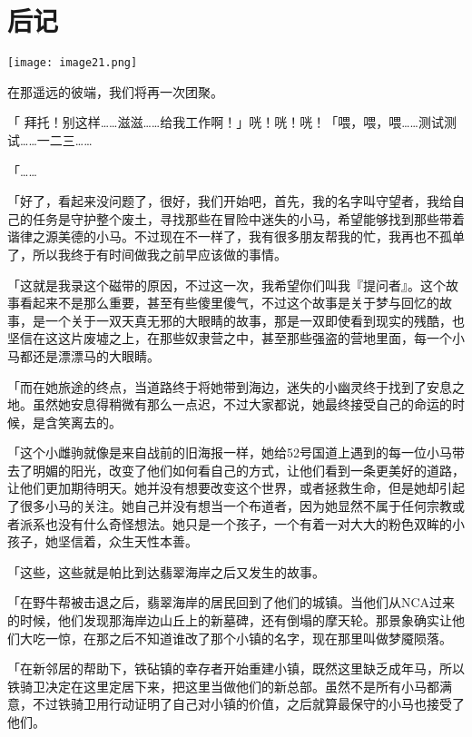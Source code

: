 \chapter{后记}

\pagestyle{chinese} %

\texttt{[image: image21.png]}

\begin{intro}
    在那遥远的彼端，我们将再一次团聚。
\end{intro}

{\rt

「 拜托！别这样……滋滋……给我工作啊！」咣！咣！咣！「喂，喂，喂……测试测试……一二三……

「……

「好了，看起来没问题了，很好，我们开始吧，首先，我的名字叫守望者，我给自己的任务是守护整个废土，寻找那些在冒险中迷失的小马，希望能够找到那些带着谐律之源美德的小马。不过现在不一样了，我有很多朋友帮我的忙，我再也不孤单了，所以我终于有时间做我之前早应该做的事情。

「这就是我录这个磁带的原因，不过这一次，我希望你们叫我『提问者』。这个故事看起来不是那么重要，甚至有些傻里傻气，不过这个故事是关于梦与回忆的故事，是一个关于一双天真无邪的大眼睛的故事，那是一双即使看到现实的残酷，也坚信在这这片废墟之上，在那些奴隶营之中，甚至那些强盗的营地里面，每一个小马都还是漂漂马的大眼睛。

「而在她旅途的终点，当道路终于将她带到海边，迷失的小幽灵终于找到了安息之地。虽然她安息得稍微有那么一点迟，不过大家都说，她最终接受自己的命运的时候，是含笑离去的。

「这个小雌驹就像是来自战前的旧海报一样，她给52号国道上遇到的每一位小马带去了明媚的阳光，改变了他们如何看自己的方式，让他们看到一条更美好的道路，让他们更加期待明天。她并没有想要改变这个世界，或者拯救生命，但是她却引起了很多小马的关注。她自己并没有想当一个布道者，因为她显然不属于任何宗教或者派系也没有什么奇怪想法。她只是一个孩子，一个有着一对大大的粉色双眸的小孩子，她坚信着，众生天性本善。

「这些，这些就是帕比到达翡翠海岸之后又发生的故事。

「在野牛帮被击退之后，翡翠海岸的居民回到了他们的城镇。当他们从NCA过来的时候，他们发现那海岸边山丘上的新墓碑，还有倒塌的摩天轮。那景象确实让他们大吃一惊，在那之后不知道谁改了那个小镇的名字，现在那里叫做梦魇陨落。

「在新邻居的帮助下，铁砧镇的幸存者开始重建小镇，既然这里缺乏成年马，所以铁骑卫决定在这里定居下来，把这里当做他们的新总部。虽然不是所有小马都满意，不过铁骑卫用行动证明了自己对小镇的价值，之后就算最保守的小马也接受了他们。

}

